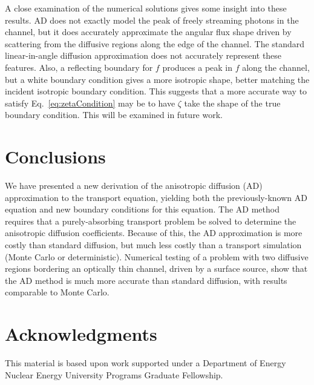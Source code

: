 \documentclass{anstrans}
\begin{document}
A close examination of the numerical solutions gives some insight into these
results.  AD does not exactly model the peak of freely streaming
photons in the channel, but it does accurately approximate the angular flux
shape driven by scattering from the diffusive regions along the edge of the
channel. 
The standard linear-in-angle diffusion approximation does not accurately
represent these
features.  Also, a reflecting boundary for $f$ produces a peak in $f$
along the channel, but a white boundary condition gives a more isotropic shape,
better matching the incident isotropic boundary condition. This suggests that a
more accurate way to satisfy Eq.~\eqref{eq:zetaCondition} may be to have
$\zeta$ take the shape of the true boundary condition. This will be examined in
future work. 


\section{Conclusions}

We have presented a new derivation of the anisotropic diffusion (AD)
approximation to
the transport equation, yielding both the previously-known AD equation and new
boundary conditions for this equation. The AD method requires that a
purely-absorbing transport problem be solved to determine the anisotropic
diffusion coefficients. Because of this, the AD approximation is more costly
than standard diffusion, but much less costly than a transport simulation
(Monte Carlo or deterministic). Numerical testing of a problem with two
diffusive regions bordering an optically thin channel, driven by a surface
source, show that the AD method is much more accurate than standard diffusion,
with results comparable to Monte Carlo. 

\section{Acknowledgments}
This material is based upon work supported under a Department of Energy Nuclear
Energy University Programs Graduate Fellowship.



\end{document}
